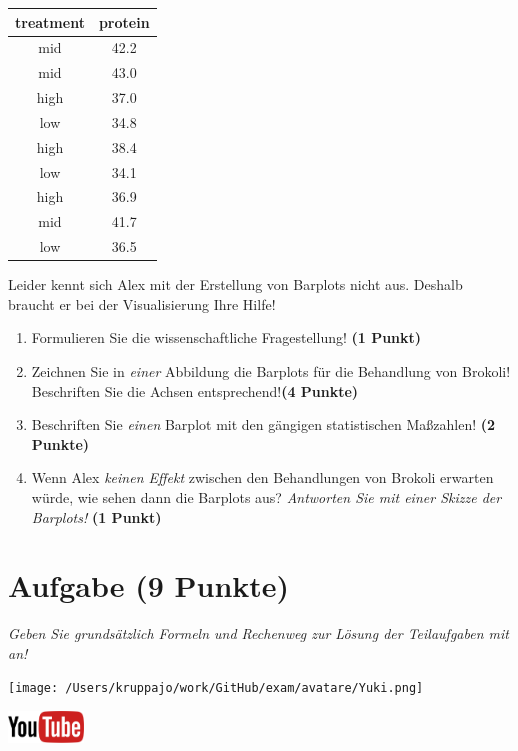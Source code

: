 \documentclass[a4paper, 9pt]{scrartcl}\usepackage[]{graphicx}\usepackage[]{xcolor}
\begin{document}
\begin{table}[!h]
\centering
\begin{tabular}{cc}
\toprule
treatment & protein\\
\midrule
mid & 42.2\\
mid & 43.0\\
high & 37.0\\
low & 34.8\\
high & 38.4\\
\addlinespace
low & 34.1\\
high & 36.9\\
mid & 41.7\\
low & 36.5\\
\bottomrule
\end{tabular}
\end{table}



Leider kennt sich Alex mit der Erstellung von Barplots nicht aus. Deshalb braucht er bei der Visualisierung Ihre Hilfe!

\begin{enumerate}
\item Formulieren Sie die wissenschaftliche Fragestellung! \textbf{(1 Punkt)}
\item Zeichnen Sie in \textit{einer} Abbildung die Barplots für die Behandlung von Brokoli! Beschriften Sie die Achsen entsprechend!\textbf{(4 Punkte)}
\item Beschriften Sie \textit{einen} Barplot mit den gängigen statistischen Maßzahlen! \textbf{(2 Punkte)}
\item Wenn Alex \textit{keinen Effekt} zwischen den Behandlungen von Brokoli erwarten würde, wie sehen dann die Barplots aus? \textit{Antworten Sie mit einer Skizze der Barplots!}
  \textbf{(1 Punkt)}
\end{enumerate} 
\clearpage

\section{Aufgabe \hfill (9 Punkte)}

\textit{Geben Sie grundsätzlich Formeln und Rechenweg zur Lösung der Teilaufgaben mit an!} \\[1Ex]
 

 
\begin{minipage}[t]{0.5\textwidth}
\texttt{[image: /Users/kruppajo/work/GitHub/exam/avatare/Yuki.png]}
\end{minipage}
\begin{minipage}[t]{0.5\textwidth}
\hfill
\href{https://youtu.be/Xf0yE-o7bEU}{\includegraphics[width = 2cm]{img/youtube}}\\[1Ex]
\end{minipage}
\vspace{1ex}
\end{document}
